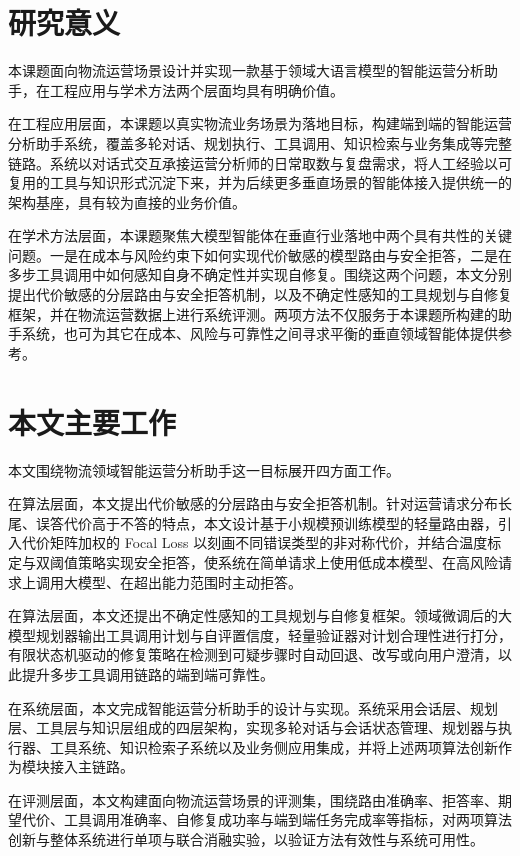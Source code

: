 \section{研究意义}

本课题面向物流运营场景设计并实现一款基于领域大语言模型的智能运营分析助手，在工程应用与学术方法两个层面均具有明确价值。

在工程应用层面，本课题以真实物流业务场景为落地目标，构建端到端的智能运营分析助手系统，覆盖多轮对话、规划执行、工具调用、知识检索与业务集成等完整链路。系统以对话式交互承接运营分析师的日常取数与复盘需求，将人工经验以可复用的工具与知识形式沉淀下来，并为后续更多垂直场景的智能体接入提供统一的架构基座，具有较为直接的业务价值。

在学术方法层面，本课题聚焦大模型智能体在垂直行业落地中两个具有共性的关键问题。一是在成本与风险约束下如何实现代价敏感的模型路由与安全拒答，二是在多步工具调用中如何感知自身不确定性并实现自修复。围绕这两个问题，本文分别提出代价敏感的分层路由与安全拒答机制，以及不确定性感知的工具规划与自修复框架，并在物流运营数据上进行系统评测。两项方法不仅服务于本课题所构建的助手系统，也可为其它在成本、风险与可靠性之间寻求平衡的垂直领域智能体提供参考。

\section{本文主要工作}

本文围绕物流领域智能运营分析助手这一目标展开四方面工作。

在算法层面，本文提出代价敏感的分层路由与安全拒答机制。针对运营请求分布长尾、误答代价高于不答的特点，本文设计基于小规模预训练模型的轻量路由器，引入代价矩阵加权的 Focal Loss 以刻画不同错误类型的非对称代价，并结合温度标定与双阈值策略实现安全拒答，使系统在简单请求上使用低成本模型、在高风险请求上调用大模型、在超出能力范围时主动拒答。

在算法层面，本文还提出不确定性感知的工具规划与自修复框架。领域微调后的大模型规划器输出工具调用计划与自评置信度，轻量验证器对计划合理性进行打分，有限状态机驱动的修复策略在检测到可疑步骤时自动回退、改写或向用户澄清，以此提升多步工具调用链路的端到端可靠性。

在系统层面，本文完成智能运营分析助手的设计与实现。系统采用会话层、规划层、工具层与知识层组成的四层架构，实现多轮对话与会话状态管理、规划器与执行器、工具系统、知识检索子系统以及业务侧应用集成，并将上述两项算法创新作为模块接入主链路。

在评测层面，本文构建面向物流运营场景的评测集，围绕路由准确率、拒答率、期望代价、工具调用准确率、自修复成功率与端到端任务完成率等指标，对两项算法创新与整体系统进行单项与联合消融实验，以验证方法有效性与系统可用性。



